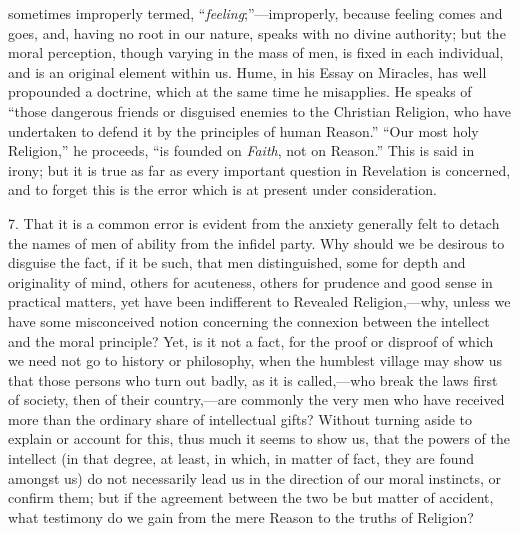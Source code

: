 sometimes improperly termed, ``\emph{feeling};''—improperly,
because feeling comes and goes, and, having no root in our nature,
speaks with no divine authority; but the moral perception, though
varying in the mass of men, is fixed in each individual, and is an
original element within us. Hume, in his Essay on Miracles, has well
propounded a doctrine, which at the same time he misapplies. He speaks
of ``those dangerous friends or disguised enemies to the Christian
Religion, who have undertaken to defend it by the principles of human
Reason.'' ``Our most holy Religion,'' he proceeds,
``is founded on \emph{Faith}, not on Reason.'' This is said in
irony; but it is true as far as every important question in Revelation
is concerned, and to forget this is the error which is at present
under consideration.

7. That it is a common error is evident from the anxiety generally
felt to detach the names of men of ability from the infidel party. Why
should we be desirous to disguise the fact, if it be such, that men
distinguished, some for depth and originality of mind, others for
acuteness, others for prudence and good sense in practical matters,
yet have been indifferent to Revealed Religion,—why, unless we have
some misconceived notion concerning the connexion between the
intellect and the moral principle? Yet, is it not a fact, for the
proof or disproof of which we need not go to history or philosophy,
when the humblest village may show us that those persons who turn out
badly, as it is called,—who break the laws first of society, then of
their country,—are commonly the very men who have received more than
the ordinary share of intellectual gifts? Without turning aside to
explain or account for this, thus much it seems to show us, that the
powers of the intellect (in that degree, at least, in which, in matter
of fact, they are found amongst us) do not necessarily lead us in the
direction of our moral instincts, or confirm them; but if the
agreement between the two be but matter of accident, what testimony do
we gain from the mere Reason to the truths of Religion?

